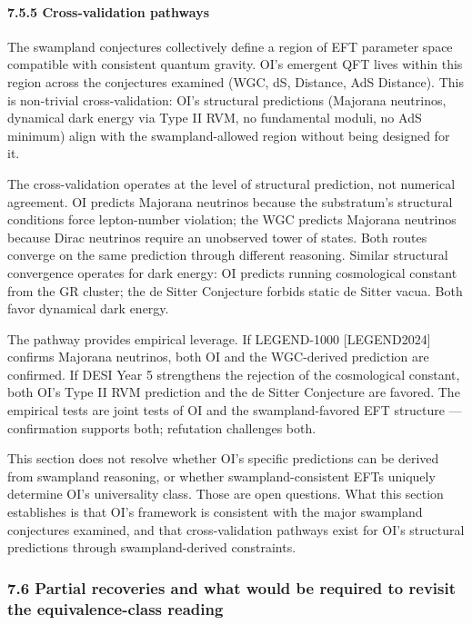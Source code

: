 \documentclass[
]{article}
\begin{document}
\hypertarget{cross-validation-pathways}{%
\paragraph{7.5.5 Cross-validation
pathways}\label{cross-validation-pathways}}

The swampland conjectures collectively define a region of EFT parameter
space compatible with consistent quantum gravity. OI's emergent QFT
lives within this region across the conjectures examined (WGC, dS,
Distance, AdS Distance). This is non-trivial cross-validation: OI's
structural predictions (Majorana neutrinos, dynamical dark energy via
Type II RVM, no fundamental moduli, no AdS minimum) align with the
swampland-allowed region without being designed for it.

The cross-validation operates at the level of structural prediction, not
numerical agreement. OI predicts Majorana neutrinos because the
substratum's structural conditions force lepton-number violation; the
WGC predicts Majorana neutrinos because Dirac neutrinos require an
unobserved tower of states. Both routes converge on the same prediction
through different reasoning. Similar structural convergence operates for
dark energy: OI predicts running cosmological constant from the GR
cluster; the de Sitter Conjecture forbids static de Sitter vacua. Both
favor dynamical dark energy.

The pathway provides empirical leverage. If LEGEND-1000 {[}LEGEND2024{]}
confirms Majorana neutrinos, both OI and the WGC-derived prediction are
confirmed. If DESI Year 5 strengthens the rejection of the cosmological
constant, both OI's Type II RVM prediction and the de Sitter Conjecture
are favored. The empirical tests are joint tests of OI and the
swampland-favored EFT structure --- confirmation supports both;
refutation challenges both.

This section does not resolve whether OI's specific predictions can be
derived from swampland reasoning, or whether swampland-consistent EFTs
uniquely determine OI's universality class. Those are open questions.
What this section establishes is that OI's framework is consistent with
the major swampland conjectures examined, and that cross-validation
pathways exist for OI's structural predictions through swampland-derived
constraints.

\hypertarget{partial-recoveries-and-what-would-be-required-to-revisit-the-equivalence-class-reading}{%
\subsubsection{7.6 Partial recoveries and what would be required to
revisit the equivalence-class
reading}\label{partial-recoveries-and-what-would-be-required-to-revisit-the-equivalence-class-reading}}
\end{document}
